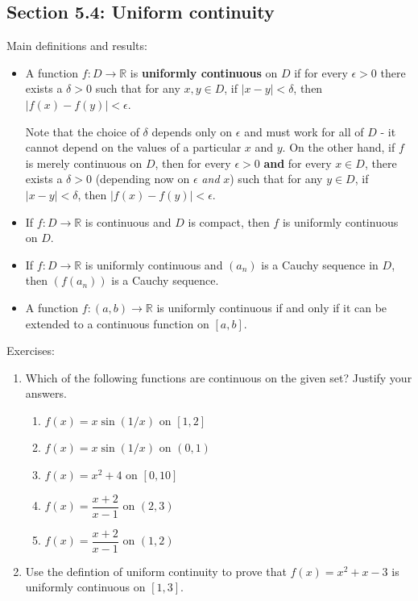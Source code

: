 \documentclass[letterpaper,12pt]{article}
\newcommand{\R}{\mathbb{R}}
\newcommand{\abs}[1]{\lvert #1\rvert}
\begin{document}
\subsection*{Section 5.4: Uniform continuity}
Main definitions and results:
\begin{itemize}
 \item A function $f:D\to\R$ is {\bf uniformly continuous} on $D$ if for every $\epsilon>0$ there exists a $\delta>0$ such that for any $x,y\in D$, if $\abs{x-y}<\delta$, then $\abs{f(x)-f(y)}<\epsilon$.

Note that the choice of $\delta$ depends only on $\epsilon$ and must work for all of $D$ - it cannot depend on the values of a particular $x$ and $y$. On the other hand, if $f$ is merely continuous on $D$, then for every $\epsilon>0$ {\bf and} for every $x\in D$, there exists a $\delta>0$ (depending now on $\epsilon$ {\em and} $x$) such that for any $y\in D$, if $\abs{x-y}<\delta$, then $\abs{f(x)-f(y)}<\epsilon$.
 \item If $f:D\to \R$ is continuous and $D$ is compact, then $f$ is uniformly continuous on $D$.
 \item If $f:D\to \R$ is uniformly continuous and $(a_n)$ is a Cauchy sequence in $D$, then $(f(a_n))$ is a Cauchy sequence.
 \item A function $f:(a,b)\to \R$ is uniformly continuous if and only if it can be extended to a continuous function on $[a,b]$.
\end{itemize}

\noindent Exercises:
\begin{enumerate}
 \item Which of the following functions are continuous on the given set? Justify your answers.
\begin{enumerate}
 \item $f(x)=x\sin(1/x)$ on $[1,2]$
 \item $f(x)=x\sin(1/x)$ on $(0,1)$
 \item $f(x)=x^2+4$ on $[0,10]$
 \item $f(x)=\dfrac{x+2}{x-1}$ on $(2,3)$
 \item $f(x)=\dfrac{x+2}{x-1}$ on $(1,2)$
\end{enumerate}
 \item Use the defintion of uniform continuity to prove that $f(x) = x^2+x-3$ is uniformly continuous on $[1,3]$.
\end{enumerate}
\end{document}

